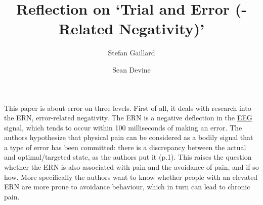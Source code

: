 \documentclass[twocolumn, serif, authordate, review]{jote-article}
\title{Reflection on `Trial and Error (-Related Negativity)' }
\author[1]{Stefan Gaillard}
\author[2]{Sean Devine}
\affil[1]{Reviewer 1}
\affil[2]{Reviewer 2}
\begin{document}
\begin{frontmatter}
\maketitle
\end{frontmatter}



This paper is about error on three levels. First of all, it deals with research into the ERN, error-related negativity. The ERN is a negative deflection in the \hyperref[sec:reviews]{EEG} \label{sec:eeg} signal, which tends to occur within 100 milliseconds of making an error. The authors hypothesize that physical pain can be considered as a bodily signal that a type of error has been committed: there is a {\textquotedbl}discrepancy between the actual and optimal/targeted state{\textquotedbl}, as the authors put it (p.1). This raises the question whether the ERN is also associated with pain and the avoidance of pain, and if so how. More specifically the authors want to know whether people with an elevated ERN are more prone to avoidance behaviour, which in turn can lead to chronic pain.
\end{document}
